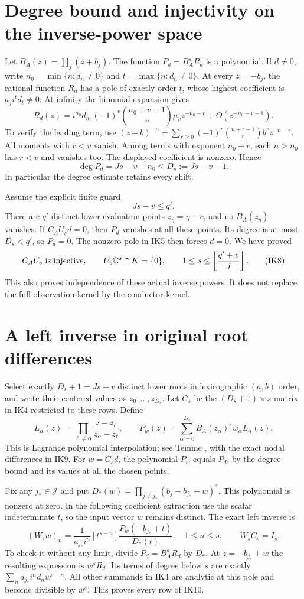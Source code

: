 \documentclass[11pt]{article}
\newcommand{\C}{\mathbb C}
\begin{document}
\section{Degree bound and injectivity on the inverse-power space}
Let $B_A(z)=\prod_j(z+b_j)$. The function $P_d=B_A^sR_d$
is a polynomial. If $d\ne0$, write
$n_0=\min\{n:d_n\ne0\}$ and $t=\max\{n:d_n\ne0\}$.
At every $z=-b_j$, the rational function $R_d$ has a pole
of exactly order $t$, whose highest coefficient is $a_ji^td_t\ne0$.
At infinity the binomial expansion gives
\[
R_d(z)=i^{n_0}d_{n_0}(-1)^v
 \binom{n_0+v-1}{v}\mu_v z^{-n_0-v}
 +O(z^{-n_0-v-1}).
\tag{IK5}
\]
To verify the leading term, use
$(z+b)^{-n}=\sum_{r\ge0}(-1)^r\binom{n+r-1}{r}b^rz^{-n-r}$.
All moments with $r<v$ vanish. Among terms with exponent
$n_0+v$, each $n>n_0$ has $r<v$ and vanishes too.
The displayed coefficient is nonzero. Hence
\[
\deg P_d=Js-v-n_0\le D_s:=Js-v-1.
\tag{IK6}
\]
In particular the degree estimate retains every shift.

Assume the explicit finite guard
\[
Js-v\le q'.
\tag{IK7}
\]
There are $q'$ distinct lower evaluation points $z_\eta=\eta-c$,
and no $B_A(z_\eta)$ vanishes. If $C_AU_sd=0$, then $P_d$
vanishes at all these points. Its degree is at most $D_s<q'$,
so $P_d=0$. The nonzero pole in IK5 then forces $d=0$.
We have proved
\[
C_AU_s\ \hbox{is injective},\qquad
U_s\C^s\cap K=\{0\},\qquad
1\le s\le\left\lfloor\frac{q'+v}{J}\right\rfloor.
\tag{IK8}
\]
This also proves independence of these actual inverse powers.
It does not replace the full observation kernel by the conductor kernel.

\section{A left inverse in original root differences}
Select exactly $D_s+1=Js-v$ distinct lower roots in lexicographic
$(a,b)$ order, and write their centered values as $z_0,\ldots,z_{D_s}$.
Let $C_s$ be the $(D_s+1)\times s$ matrix in IK4 restricted
to these rows. Define
\[
L_\alpha(z)=\prod_{\ell\ne\alpha}
 \frac{z-z_\ell}{z_\alpha-z_\ell},\qquad
P_w(z)=\sum_{\alpha=0}^{D_s}B_A(z_\alpha)^s
 w_\alpha L_\alpha(z).
\tag{IK9}
\]
This is Lagrange polynomial interpolation; see Temme \cite{Temme}, with the exact nodal differences in IK9. For $w=C_sd$, the polynomial $P_w$ equals $P_d$, by the
degree bound and its values at all the chosen points.

Fix any $j_*\in\mathcal J$ and put
$D_*(w)=\prod_{j\ne j_*}(b_j-b_{j_*}+w)^s$.
This polynomial is nonzero at zero. In the following coefficient extraction use the scalar indeterminate $t$, so the input vector $w$ remains distinct. The exact left inverse is
\[
(W_sw)_n=
\frac1{a_{j_*}i^n}
[t^{s-n}]\frac{P_w(-b_{j_*}+t)}{D_*(t)},
\quad 1\le n\le s,\qquad
W_sC_s=I_s .
\tag{IK10}
\]
To check it without any limit, divide $P_d=B_A^sR_d$ by $D_*$.
At $z=-b_{j_*}+w$ the resulting expression is $w^sR_d$.
Its terms of degree below $s$ are exactly
$\sum_n a_{j_*}i^n d_nw^{s-n}$.
All other summands in IK4 are analytic at this pole and become
divisible by $w^s$. This proves every row of IK10.
\end{document}
